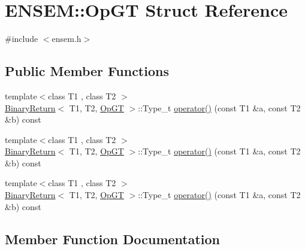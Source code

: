 \hypertarget{structENSEM_1_1OpGT}{}\section{E\+N\+S\+EM\+:\+:Op\+GT Struct Reference}
\label{structENSEM_1_1OpGT}


{\ttfamily \#include $<$ensem.\+h$>$}

\subsection*{Public Member Functions}
\begin{DoxyCompactItemize}
\item 
{\footnotesize template$<$class T1 , class T2 $>$ }\\\mbox{\hyperlink{structENSEM_1_1BinaryReturn}{Binary\+Return}}$<$ T1, T2, \mbox{\hyperlink{structENSEM_1_1OpGT}{Op\+GT}} $>$\+::Type\+\_\+t \mbox{\hyperlink{structENSEM_1_1OpGT_acc420fbf856bae16d2db09a4c622ff4f}{operator()}} (const T1 \&a, const T2 \&b) const
\item 
{\footnotesize template$<$class T1 , class T2 $>$ }\\\mbox{\hyperlink{structENSEM_1_1BinaryReturn}{Binary\+Return}}$<$ T1, T2, \mbox{\hyperlink{structENSEM_1_1OpGT}{Op\+GT}} $>$\+::Type\+\_\+t \mbox{\hyperlink{structENSEM_1_1OpGT_acc420fbf856bae16d2db09a4c622ff4f}{operator()}} (const T1 \&a, const T2 \&b) const
\item 
{\footnotesize template$<$class T1 , class T2 $>$ }\\\mbox{\hyperlink{structENSEM_1_1BinaryReturn}{Binary\+Return}}$<$ T1, T2, \mbox{\hyperlink{structENSEM_1_1OpGT}{Op\+GT}} $>$\+::Type\+\_\+t \mbox{\hyperlink{structENSEM_1_1OpGT_acc420fbf856bae16d2db09a4c622ff4f}{operator()}} (const T1 \&a, const T2 \&b) const
\end{DoxyCompactItemize}


\subsection{Member Function Documentation}
\mbox{\label{structENSEM_1_1OpGT_acc420fbf856bae16d2db09a4c622ff4f}} 

